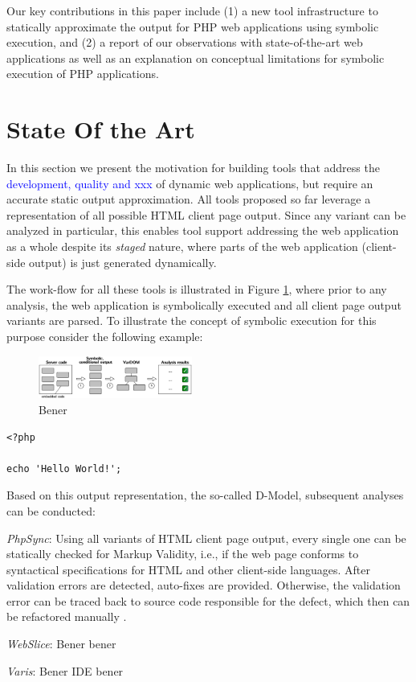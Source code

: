 \documentclass[preprint]{sig-alternate-05-2015}
\begin{document}
Our key contributions in this paper include (1) a new tool infrastructure to statically approximate the output for PHP web applications using symbolic execution, and (2) a report of our observations with state-of-the-art web applications as well as an explanation on conceptual limitations for symbolic execution of PHP applications.

\section{State Of the Art}
In this section we present the motivation for building tools that address the \textcolor{blue}{development, quality and xxx} of dynamic web applications, but require an accurate static output approximation. All tools proposed so far \cite{Nguyen:2014:BCG:2635868.2635928,Nguyen:2015:CPS:2786805.2786872,Nguyen:2015:VIS:2819009.2819140,Nguyen:2011:AFH:2190078.2190142} leverage a representation of all possible HTML client page output. Since any variant can be analyzed in particular, this enables tool support addressing the web application as a whole despite its \emph{staged} nature, where parts of the web application (client-side output) is just generated dynamically.

The work-flow for all these tools is illustrated in Figure \ref{fig:approach}, where prior to any analysis, the web application is symbolically executed and all client page output variants are parsed. To illustrate the concept of symbolic execution for this purpose consider the following example:

\begin{figure}[t!]
	\centering
	\includegraphics[width=0.45\textwidth]{images-paper/approach}
	
	\caption{Bener}
	\label{fig:approach}
\end{figure}

\begin{lstlisting}
<?php

echo 'Hello World!';
\end{lstlisting}

Based on this output representation, the so-called D-Model, subsequent analyses can be conducted:

\begin{compactitem}
\item \emph{PhpSync}: Using all variants of  HTML client page output, every single one can be statically checked for Markup Validity, i.e., if the web page conforms to syntactical specifications for HTML and other client-side languages. After validation errors are detected, auto-fixes are provided. Otherwise, the validation error can be traced back to source code responsible for the defect, which then can be refactored manually \cite{Nguyen:2011:AFH:2190078.2190142}.

\item \emph{WebSlice}: Bener bener
\item \emph{Varis}: Bener IDE bener
\end{compactitem}
\end{document}
